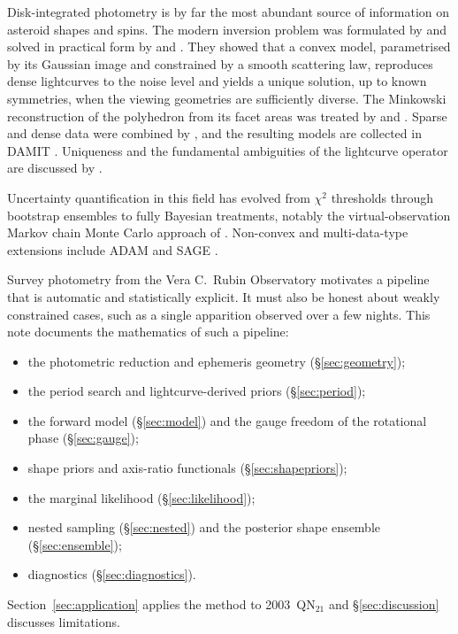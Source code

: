 \documentclass[11pt,a4paper]{article}
\theoremstyle{remark}
\begin{document}
Disk-integrated photometry is by far the most abundant source of information on asteroid shapes and
spins. The modern inversion problem was formulated by \citet{kaasalainen1992} and solved in practical
form by \citet{kaasalainen2001a} and \citet{kaasalainen2001b}. They showed that a convex model,
parametrised by its Gaussian image and constrained by a smooth scattering law, reproduces dense
lightcurves to the noise level and yields a unique solution, up to known symmetries, when the viewing
geometries are sufficiently diverse. The Minkowski reconstruction of the polyhedron from its facet
areas was treated by \citet{little1983} and \citet{lamberg1993}. Sparse and dense data were combined
by \citet{durech2009}, and the resulting models are collected in DAMIT \citep{durech2010}. Uniqueness
and the fundamental ambiguities of the lightcurve operator are discussed by \citet{kaasalainen2006}.

Uncertainty quantification in this field has evolved from $\chi^2$ thresholds
\citep[e.g.][]{durech2018} through bootstrap ensembles to fully Bayesian treatments, notably the
virtual-observation Markov chain Monte Carlo approach of \citet{muinonen2020}. Non-convex and
multi-data-type extensions include ADAM \citep{viikinkoski2015} and SAGE \citep{bartczak2018}.

Survey photometry from the Vera C.\ Rubin Observatory \citep{ivezic2019} motivates a pipeline that is
automatic and statistically explicit. It must also be honest about weakly constrained cases, such as a
single apparition observed over a few nights. This note documents the mathematics of such a pipeline:
\begin{itemize}[nosep]
\item the photometric reduction and ephemeris geometry (\S\ref{sec:geometry});
\item the period search and lightcurve-derived priors (\S\ref{sec:period});
\item the forward model (\S\ref{sec:model}) and the gauge freedom of the rotational phase
  (\S\ref{sec:gauge});
\item shape priors and axis-ratio functionals (\S\ref{sec:shapepriors});
\item the marginal likelihood (\S\ref{sec:likelihood});
\item nested sampling (\S\ref{sec:nested}) and the posterior shape ensemble (\S\ref{sec:ensemble});
\item diagnostics (\S\ref{sec:diagnostics}).
\end{itemize}
Section~\ref{sec:application} applies the method to 2003~QN$_{21}$ and \S\ref{sec:discussion}
discusses limitations.
\end{document}
